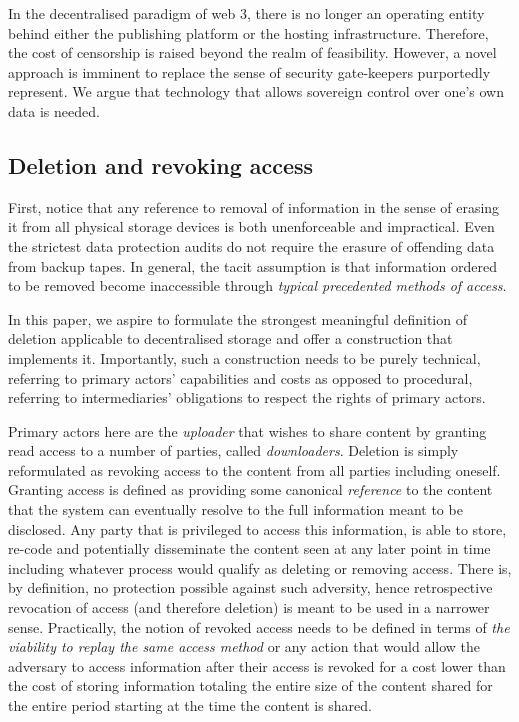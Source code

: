 In the decentralised paradigm of web 3, there is no longer an operating entity behind either the publishing platform or the hosting infrastructure. Therefore, the cost of censorship is raised beyond the realm of feasibility. However, a novel approach is imminent to replace the sense of security gate-keepers purportedly represent. We argue that technology that allows sovereign control over one's own data is needed.  

\subsection{Deletion and revoking access}

First, notice that any reference to removal of information in the sense of erasing it from all physical storage devices is both unenforceable and impractical. Even the strictest data protection audits do not require the erasure of offending data from backup tapes. In general, the tacit assumption is that information ordered to be removed become inaccessible through \emph{typical precedented methods of access}.

In this paper, we aspire to formulate the strongest meaningful definition of deletion applicable to decentralised storage and offer a construction that implements it.
Importantly, such a construction needs to be purely technical, referring to primary actors' capabilities and costs as opposed to procedural, referring to intermediaries' obligations to respect the rights of primary actors. 

Primary actors here are the \emph{uploader} that wishes to share content by granting read access to a number of parties, called \emph{downloaders}. Deletion is simply reformulated as revoking access
to the content from all parties including oneself. Granting access is defined as providing some canonical \emph{reference} to the content that the system can eventually resolve to the full information meant to be disclosed. Any party that is privileged to access this information, is able to store, re-code and potentially disseminate the content seen at any later point in time including whatever process would qualify as deleting or removing access. There is, by definition, no protection possible against such adversity, hence retrospective revocation of access (and therefore deletion) is meant to be used in a narrower sense. Practically, the notion of revoked access needs to be defined in terms of \emph{the viability to replay the same access method} or any action that would allow the adversary to access information after their access is revoked for a cost lower than the cost of storing information totaling the entire size of the content shared for the entire period starting at the time the content is shared.

